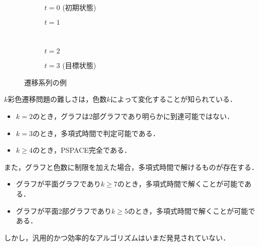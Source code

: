 \begin{figure}[htbp]
  \centering
  \begin{subfigure}{0.4\hsize}
    \centering
    
    \caption{$t=0$ (初期状態)}
   \end{subfigure}
   \hspace{1cm}
   \begin{subfigure}{0.4\hsize}
    \centering
    
    \caption{$t=1$}
   \end{subfigure}
   \\
   \begin{subfigure}{0.4\hsize}
    \centering
    
    \caption{$t=2$}
   \end{subfigure}
   \hspace{1cm}
   \begin{subfigure}{0.4\hsize}
    \centering
    
    \caption{$t=3$ (目標状態)}
   \end{subfigure}

   \caption{遷移系列の例}
   \label{fig:ans_varrecol}
\end{figure}

$k$彩色遷移問題の難しさは，色数$k$によって変化することが知られている． 
\begin{itemize}
  \item $k = 2$のとき，グラフは2部グラフであり明らかに到達可能ではない． \cite{CHM2011:JGT}
  \item $k = 3$のとき，多項式時間で判定可能である． \cite{CHM2011:JGT}
  \item $k \geq 4$のとき，PSPACE完全である． \cite{BC2009:tcs}
\end{itemize}
また，グラフと色数に制限を加えた場合，多項式時間で解けるものが存在する． \cite{BC2009:tcs}
\begin{itemize}
  \item グラフが平面グラフであり$k \geq 7$のとき，多項式時間で解くことが可能である．
  \item グラフが平面2部グラフであり$k \geq 5$のとき，多項式時間で解くことが可能である．
\end{itemize}
しかし，汎用的かつ効率的なアルゴリズムはいまだ発見されていない．

